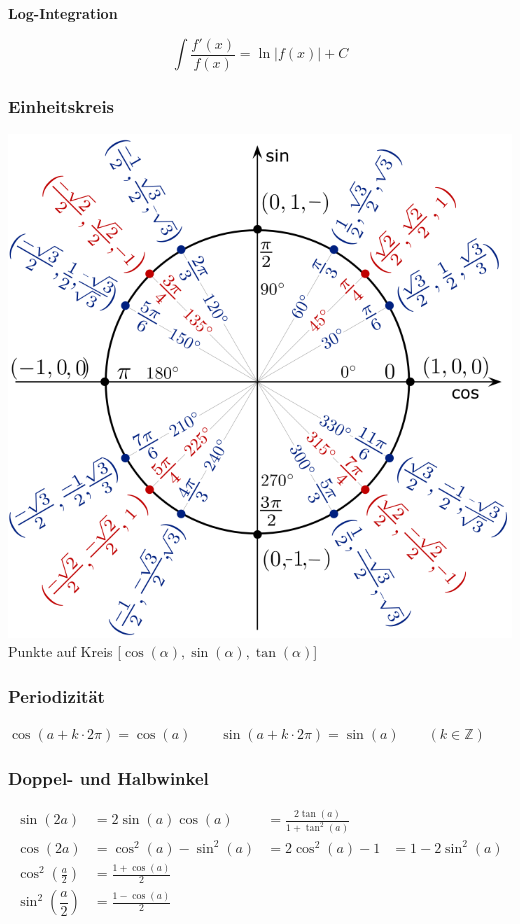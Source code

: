 \begin{center}
	\begin{minipage}{0.2\textwidth}
		\noindent\textbf{Log-Integration}
	\end{minipage}%
	\begin{minipage}{0.3\textwidth}
		\[\int \frac{f'(x)}{f(x)} = \ln\left|f(x)\right| + C\]
	\end{minipage}
\end{center}
\subsubsection{Einheitskreis}
\begin{center}
	\includegraphics[width=0.8\columnwidth]{Images/einheitskreis}\\
	Punkte auf Kreis [$\cos(\alpha), \sin(\alpha), \tan(\alpha)$]
\end{center}

\subsubsection{Periodizität}
$\cos(a+k\cdot2\pi)=\cos(a) \qquad \sin(a+k\cdot2\pi)=\sin(a) \qquad
(k \in \mathbb{Z})$

\subsubsection{Doppel- und Halbwinkel}	
\begin{align*}
	\sin(2a) &=2\sin(a)\cos(a) &= \frac{2\tan(a)}{1 +\tan^2(a)}\\
	\cos(2a) &=\cos^2(a)-\sin^2(a) &= 2\cos^2(a)-1 &= 1-2\sin^2(a)\\
	\cos^2 \left(\frac{a}{2}\right) &=\frac{1+\cos(a)}{2} \\
	\sin^2 \left(\dfrac{a}{2}\right)&=\frac{1-\cos(a)}{2}
\end{align*}

